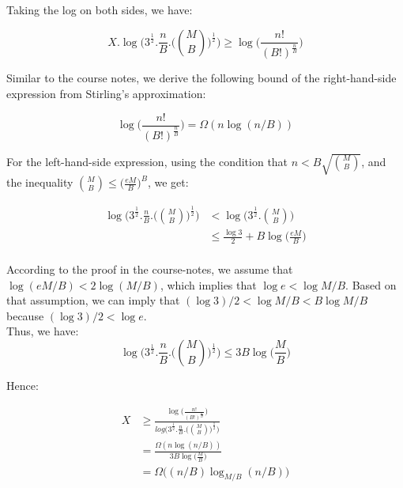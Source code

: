 Taking the log on both sides, we have:

$$ X.\log \bigg(3^\frac{1}{2}.\frac{n}{B}.\bigg(\binom MB\bigg)^\frac{1}{2} \bigg) \geq \log \bigg(\frac{n!}{(B!)^{\frac{n}{B}}}\bigg)$$

Similar to the course notes, we derive the following bound of the right-hand-side expression from Stirling's approximation:

$$\log \biggl(\frac{n!}{(B!)^{\frac{n}{B}}}\bigg) = \Omega(n\log(n/B))$$

For the left-hand-side expression, using the condition that $n < B\sqrt{\binom MB}$, and the inequality $\binom MB \leq 
\big(\frac{eM}{B}\big)^B$, we get:

\begin{equation*}
  \begin{aligned}
  \log \bigg(3^\frac{1}{2}.\frac{n}{B}.\bigg(\binom MB\bigg)^\frac{1}{2} \bigg) &< \log \bigg(3^\frac{1}{2} . \binom MB \bigg) \\
  &\leq \frac{\log 3}{2} + B \log \biggl( \frac{eM}{B} \bigg) \\
\end{aligned}
\end{equation*}

According to the proof in the course-notes, we assume that $\log(eM/B) < 2\log(M/B)$, which implies that $\log e < \log M/B$. Based on that assumption, we can imply that $(\log 3) / 2 < \log M/B < B \log M/B$ because $(\log 3) / 2 < \log e$. \\

Thus, we have:
$$\log \bigg(3^\frac{1}{2}.\frac{n}{B}.\bigg(\binom MB\bigg)^\frac{1}{2} \bigg) \leq 3B \log \big(\frac{M}{B}\big)$$

Hence:

\begin{equation*}
  \begin{aligned}
    X &\geq \frac{\log \biggl(\frac{n!}{(B!)^{\frac{n}{B}}}\bigg)}
    {log \bigg(3^\frac{1}{2}.\frac{n}{B}.\bigg(\binom MB\bigg)^\frac{1}{2} \bigg)} \\
    & = \frac{\Omega(n\log(n/B))}{3B \log \big(\frac{M}{B}\big)} \\
    & = \Omega \big( (n/B)\log_{M/B}(n/B)\big)
\end{aligned}
\end{equation*}


